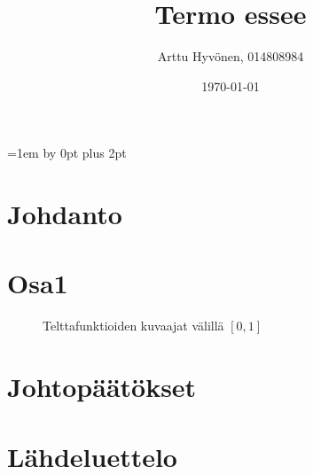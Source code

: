 \documentclass[12pt,a4paper,titlepage]{article}
\title{Termo essee}
\author{\begin{tabular}{c}
Arttu Hyv{\"o}nen, 014808984
\end{tabular}}
\date{\today}
\begin{document}
\maketitle
{}

\restoregeometry

\thispagestyle{empty}
\tableofcontents
\newpage
\setcounter{page}{1}
\parskip=1em \advance\parskip by 0pt plus 2pt
\pagestyle{fancy}


\section{Johdanto}

\newpage
\section{Osa1}

\begin{figure}[H]
\centering
\caption{Telttafunktioiden kuvaajat välillä $[0,1]$}
\end{figure} 

\newpage
\section{Johtopäätökset}


\newpage
\section{Lähdeluettelo}




\appendix
\end{document}

